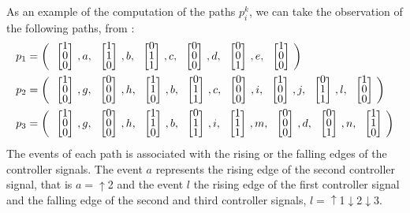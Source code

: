 As an example of the computation of the paths $p_i^k$, we can take the observation of the following
paths, from \cite{moreira2018enhanced}:
\setlength\arraycolsep{2pt}
\begin{align*}
  p_1&= \left(\colvec{1\\0\\0},a,\colvec{1\\1\\0},b,\colvec{0\\1\\1},c,\colvec{0\\0\\0},d,\colvec{0\\0\\1},e,\colvec{1\\0\\0}\right) \\
  p_2&= \left(\colvec{1\\0\\0},g,\colvec{0\\0\\0},h,\colvec{1\\1\\0},b,\colvec{0\\1\\1},c,\colvec{0\\0\\0},i,\colvec{1\\0\\0},j,\colvec{0\\1\\1},l,\colvec{1\\0\\0}\right) \\
  p_3&= \left(\colvec{1\\0\\0},g,\colvec{0\\0\\0},h,\colvec{1\\1\\0},b,\colvec{0\\1\\1},i,\colvec{1\\1\\1},m,\colvec{0\\0\\0},d,\colvec{0\\0\\1},n,\colvec{1\\1\\0}\right) \\
\end{align*}
The events of each path is associated with the rising or the falling edges of
the controller signals. The event $a$ represents the rising edge of the second
controller signal, that is $a=\uparrow$2 and the event $l$ the rising edge of the first
controller signal and the falling edge of the second
and third controller signals, $l=\uparrow$1$\downarrow$2$\downarrow$3.

